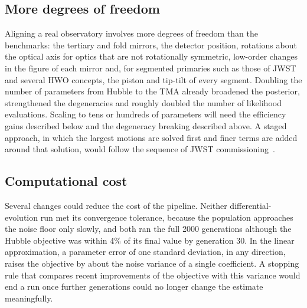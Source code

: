 \subsection{More degrees of freedom}
Aligning a real observatory involves more degrees of freedom than the benchmarks: the tertiary and fold mirrors, the detector position, rotations about the optical axis for optics that are not rotationally symmetric, low-order changes in the figure of each mirror and, for segmented primaries such as those of JWST and several HWO concepts, the piston and tip-tilt of every segment. Doubling the number of parameters from Hubble to the TMA already broadened the posterior, strengthened the degeneracies and roughly doubled the number of likelihood evaluations. Scaling to tens or hundreds of parameters will need the efficiency gains described below and the degeneracy breaking described above. A staged approach, in which the largest motions are solved first and finer terms are added around that solution, would follow the sequence of JWST commissioning~\citep{Acton2022}.

\subsection{Computational cost}
Several changes could reduce the cost of the pipeline. Neither differential-evolution run met its convergence tolerance, because the population approaches the noise floor only slowly, and both ran the full 2000 generations although the Hubble objective was within 4\% of its final value by generation 30. In the linear approximation, a parameter error of one standard deviation, in any direction, raises the objective by about the noise variance of a single coefficient. A stopping rule that compares recent improvements of the objective with this variance would end a run once further generations could no longer change the estimate meaningfully.

